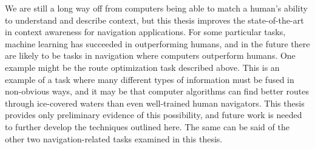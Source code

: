We are still a long way off from computers being able to match a human's ability to understand and describe context, but this thesis improves the state-of-the-art in context awareness for navigation applications. For some particular tasks, machine learning has succeeded in outperforming humans, and in the future there are likely to be tasks in navigation where computers outperform humans. One example might be the route optimization task described above. This is an example of a task where many different types of information must be fused in non-obvious ways, and it may be that computer algorithms can find better routes through ice-covered waters than even well-trained human navigators. This thesis provides only preliminary evidence of this possibility, and future work is needed to further develop the techniques outlined here. The same can be said of the other two navigation-related tasks examined in this thesis.